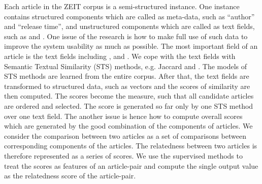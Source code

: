 Each article in the ZEIT corpus is a semi-structured instance. One instance contains structured components which are called as meta-data, such as ``author'' and ``release time'', and unstructured components which are called as text fields, such as \ititle{} and \icontent{}. One issue of the research is how to make full use of such data to improve the system usability as much as possible. The most important field of an article is the text fields including \ititle{}, \isummary{} and \icontent{}. We cope with the text fields with Semantic Textual Similarity (STS) methods, e.g. Jaccard and \tfidf{}. The models of STS methods are learned from the entire corpus. After that, the text fields are transformed to structured data, such as vectors and the scores of similarity are then computed. The scores become the measure, such that all candidate articles are ordered and selected. The score is generated so far only by one STS method over one text field. The another issue is hence how to compute overall scores which are generated by the good combination of the components of articles. We consider the comparison between two articles as a set of comparisons between corresponding components of the articles. The relatedness between two articles is therefore represented as a series of scores. We use the supervised methods to treat the scores as features of an article-pair and compute the single output value as the relatedness score of the article-pair.

\clearpage


